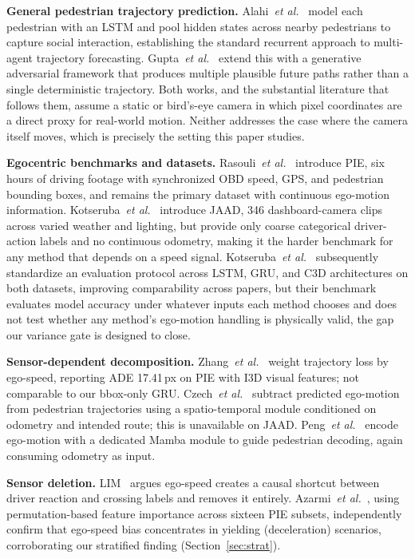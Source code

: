 \documentclass[conference]{IEEEtran}
\begin{document}
\textbf{General pedestrian trajectory prediction.}
Alahi~\textit{et al.}~\cite{alahi2016sociallstm} model each pedestrian with an
LSTM and pool hidden states across nearby pedestrians to capture social
interaction, establishing the standard recurrent approach to multi-agent
trajectory forecasting. Gupta~\textit{et al.}~\cite{gupta2018socialgan}
extend this with a generative adversarial framework that produces multiple
plausible future paths rather than a single deterministic trajectory.
Both works, and the substantial literature that follows them, assume a
static or bird's-eye camera in which pixel coordinates are a direct proxy
for real-world motion. Neither addresses the case where the camera itself
moves, which is precisely the setting this paper studies.

\textbf{Egocentric benchmarks and datasets.}
Rasouli~\textit{et al.}~\cite{rasouli2019pie} introduce PIE, six hours of
driving footage with synchronized OBD speed, GPS, and pedestrian bounding
boxes, and remains the primary dataset with continuous ego-motion
information. Kotseruba~\textit{et al.}~\cite{kotseruba2017jaad} introduce
JAAD, 346 dashboard-camera clips across varied weather and lighting, but
provide only coarse categorical driver-action labels and no continuous
odometry, making it the harder benchmark for any method that depends on a
speed signal. Kotseruba~\textit{et al.}~\cite{kotseruba2021benchmark}
subsequently standardize an evaluation protocol across LSTM, GRU, and
C3D architectures on both datasets, improving comparability across
papers, but their benchmark evaluates model accuracy under whatever
inputs each method chooses and does not test whether any method's
ego-motion handling is physically valid, the gap our variance gate is
designed to close.

\textbf{Sensor-dependent decomposition.}
Zhang~\textit{et al.}~\cite{zhang2024decouple} weight trajectory loss by ego-speed, reporting ADE 17.41\,px on PIE with I3D visual features; not comparable to our bbox-only GRU.
Czech~\textit{et al.}~\cite{czech2023behavior} subtract predicted ego-motion from pedestrian trajectories using a spatio-temporal module conditioned on odometry and intended route; this is unavailable on JAAD.
Peng~\textit{et al.}~\cite{peng2026trajmamba} encode ego-motion with a dedicated Mamba module to guide pedestrian decoding, again consuming odometry as input.

\textbf{Sensor deletion.}
LIM~\cite{lim2025tits} argues ego-speed creates a causal shortcut between driver reaction and crossing labels and removes it entirely.
Azarmi~\textit{et al.}~\cite{azarmi2024feature}, using permutation-based feature importance across sixteen PIE subsets, independently confirm that ego-speed bias concentrates in yielding (deceleration) scenarios, corroborating our stratified finding (Section~\ref{sec:strat}).
\end{document}
